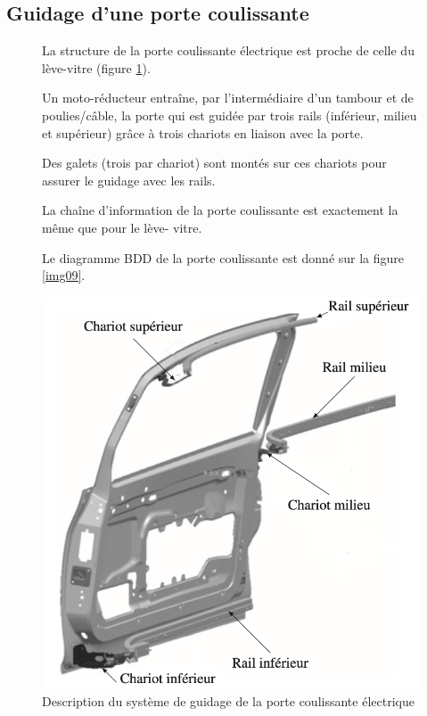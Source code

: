 
\subsection{Guidage d'une porte coulissante}

\begin{figure}[!h]
\begin{minipage}{0.5\linewidth}
La structure de la porte coulissante électrique est proche de celle du lève-vitre (figure \ref{img08}).

Un moto-réducteur entraîne, par l'intermédiaire
d'un tambour et de poulies/câble, la porte qui est guidée par trois rails (inférieur, milieu et supérieur) grâce à trois chariots en liaison avec la porte.

Des galets (trois par chariot) sont montés sur ces chariots pour assurer le guidage avec les rails.

La chaîne d'information de la porte coulissante est exactement la même que pour le lève- vitre.

Le diagramme BDD de la porte coulissante est donné sur la figure \ref{img09}. 

\end{minipage}\hfill
\begin{minipage}{0.45\linewidth}
\centering\includegraphics[width=0.7\linewidth]{img/figure08}
 \caption{Description du système de guidage de la porte coulissante électrique}
 \label{img08}
\end{minipage}
\end{figure}

